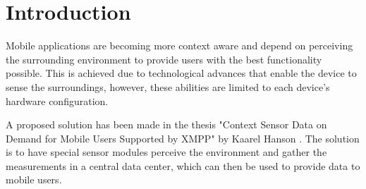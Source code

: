 


\chapter{Introduction}

\ifpdf
    \graphicspath{{1_introduction/figures/PNG/}{1_introduction/figures/PDF/}{1_introduction/figures/}}
\else
    \graphicspath{{1_introduction/figures/EPS/}{1_introduction/figures/}}
\fi





Mobile applications are becoming more context aware and depend on perceiving the surrounding environment to provide users with the best functionality possible. This is achieved due to technological advances that enable the device to sense the surroundings, however, these abilities are limited to each device's hardware configuration.

A proposed solution has been made in the thesis "Context Sensor Data on Demand for Mobile Users Supported by XMPP" by Kaarel Hanson \cite{prev_thesis}. The solution is to have special sensor modules perceive the environment and gather the measurements in a central data center, which can then be used to provide data to mobile users. 

